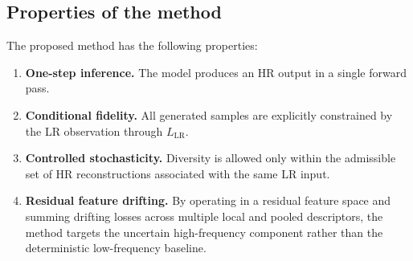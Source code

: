 \documentclass{article}
\begin{document}
\subsection{Properties of the method}

The proposed method has the following properties:
\begin{enumerate}
    \item \textbf{One-step inference.} The model produces an HR output in a single forward pass.
    \item \textbf{Conditional fidelity.} All generated samples are explicitly constrained by the LR observation through \(L_{\mathrm{LR}}\).
    \item \textbf{Controlled stochasticity.} Diversity is allowed only within the admissible set of HR reconstructions associated with the same LR input.
    \item \textbf{Residual feature drifting.} By operating in a residual feature space and summing drifting losses across multiple local and pooled descriptors, the method targets the uncertain high-frequency component rather than the deterministic low-frequency baseline.
\end{enumerate}

\newpage


\end{document}
